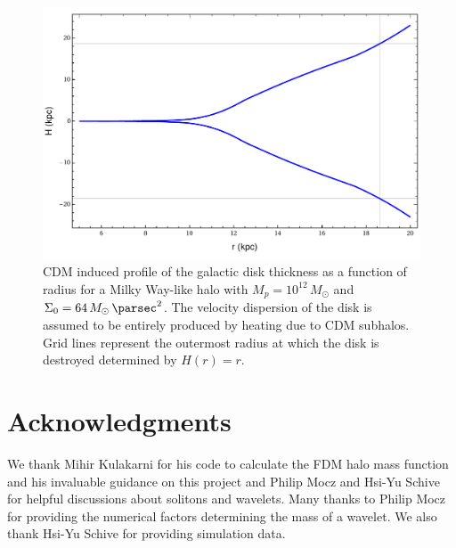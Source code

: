 \documentclass[usenatbib]{mnras}
\begin{document}
\begin{figure}
\includegraphics[width=\columnwidth]{disk_shape_CDM}
\vspace*{-5mm}
\caption{CDM induced profile of the galactic disk thickness as a function of radius for a Milky Way-like halo with $M_p = 10^{12} \, M_\odot$ and $\Sigma_0 = 64 \, M_\odot \, \si{\per\parsec^2}$. The velocity dispersion of the disk is assumed to be entirely produced by heating due to CDM subhalos. Grid lines represent the outermost radius at which the disk is destroyed determined by $H(r) = r$. }
\label{fig:disk_shape_CDM}
\end{figure}



\section*{Acknowledgments}
We thank Mihir Kulakarni for his code to calculate the FDM halo mass function and his invaluable guidance on this project and Philip Mocz and Hsi-Yu Schive for helpful discussions about solitons and wavelets. Many thanks to Philip Mocz for providing the numerical factors determining the mass of a wavelet. We also thank Hsi-Yu Schive for providing simulation data. 




 
\end{document}

